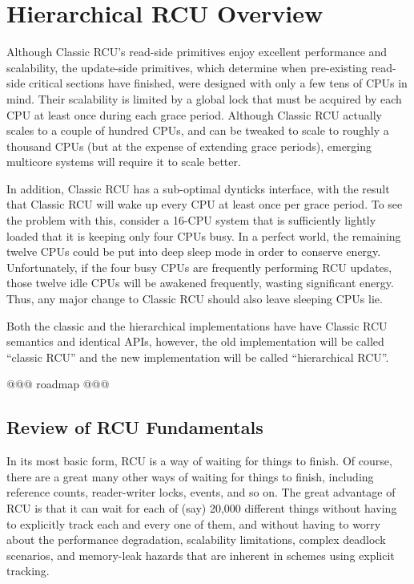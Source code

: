 
\section{Hierarchical RCU Overview}
\label{app:rcuimpl:rcutree:Hierarchical RCU Overview}

Although Classic RCU's read-side primitives enjoy excellent
performance and scalability, the update-side primitives, which
determine when pre-existing read-side critical sections have
finished, were designed with only a few tens of CPUs in mind.
Their scalability is limited by a global lock that must be
acquired by each CPU at least once during each grace period.
Although Classic RCU actually scales to a couple of hundred CPUs, and
can be tweaked to scale to roughly a thousand CPUs (but at the expense of
extending grace periods), emerging multicore systems will require
it to scale better.

In addition, Classic RCU has a sub-optimal dynticks interface,
with the result that Classic RCU will wake up every CPU at least
once per grace period.
To see the problem with this, consider a 16-CPU system that
is sufficiently lightly loaded that it is keeping only four
CPUs busy.
In a perfect world, the remaining twelve CPUs could be put into
deep sleep mode in order to conserve energy.
Unfortunately, if the four busy CPUs are frequently performing
RCU updates, those twelve idle CPUs will be awakened frequently,
wasting significant energy.
Thus, any major change to Classic RCU should also leave sleeping CPUs lie.

Both the classic and the hierarchical implementations
have have Classic RCU semantics and identical APIs, however,
the old implementation will be called ``classic RCU''
and the new implementation will be called ``hierarchical RCU''.

@@@ roadmap @@@

\subsection{Review of RCU Fundamentals}
\label{app:rcuimpl:rcutree:Review of RCU Fundamentals}

In its most basic form, RCU is a way of waiting for things to finish.
Of course, there are a great many other ways of waiting for things to
finish, including reference counts, reader-writer locks, events, and so on.
The great advantage of RCU is that it can wait for each of
(say) 20,000 different things without having to explicitly
track each and every one of them, and without having to worry about
the performance degradation, scalability limitations, complex deadlock
scenarios, and memory-leak hazards that are inherent in schemes
using explicit tracking.

